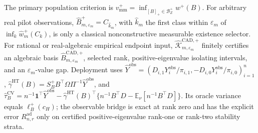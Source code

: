 The primary population criterion is \(v_{\mathrm{mm}}^+=\inf_{[B]_+\in\mathcal B_Z^+}w^+(B)\).  For arbitrary real pilot observations, \(\widehat B_{m,\varepsilon_m}^+=C_{\widehat k_m}\), with \(\widehat k_m\) the first class within \(\varepsilon_m\) of \(\inf_k\widehat w_m^+(C_k)\), is only a classical nonconstructive measurable existence selector.  For rational or real-algebraic empirical endpoint input, \(\widehat{\mathscr K}_{m,\varepsilon_m}^{\mathrm{CAD},+}\) finitely certifies an algebraic basis \(\widehat B_{m,\varepsilon_m}^{\mathrm{CAD},+}\), selected rank, positive-eigenvalue isolating intervals, and an \(\varepsilon_m\)-value gap.  Deployment uses \(\widehat Y^{\mathrm{obs}}=(D_{i,1}Y_i^{\mathrm{obs}}/\pi_{i,1},-D_{i,0}Y_i^{\mathrm{obs}}/\pi_{i,0})_{i=1}^n\), \(\widehat\gamma^{\mathrm{HT}}(B)=S_B^+B^{\top}\Omega\Pi^{-1}\widehat Y^{\mathrm{obs}}\), and \(\widehat\tau_B^{\mathrm{CV}}=n^{-1}\mathbf1^{\top}\widehat Y^{\mathrm{obs}}-\widehat\gamma^{\mathrm{HT}}(B)^{\top}\{n^{-1}B^{\top}D-\mathbb E_\nu[n^{-1}B^{\top}D]\}\).  Its oracle variance equals \(\ell_B^+(c_H)\); the observable bridge is exact at rank zero and has the explicit error \(R_{n,r}^{\mathrm{ad}}\) only on certified positive-eigenvalue rank-one or rank-two stability strata.